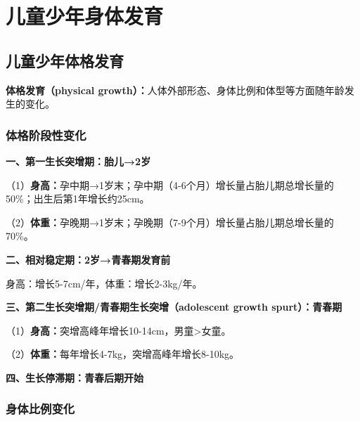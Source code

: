 \chapter{儿童少年身体发育}
\setcounter{chapter}{4}

\section{儿童少年体格发育}

\begin{defbox}
\textbf{体格发育（physical growth）：}人体外部形态、身体比例和体型等方面随年龄发生的变化。
\end{defbox}

\subsection{体格阶段性变化}

\begin{keybox}
\textbf{一、第一生长突增期：胎儿→2岁}

（1）\textbf{身高：}孕中期→1岁末；孕中期（4-6个月）增长量占胎儿期总增长量的50\%；出生后第1年增长约25cm。

（2）\textbf{体重：}孕晚期→1岁末；孕晚期（7-9个月）增长量占胎儿期总增长量的70\%。

\textbf{二、相对稳定期：2岁→青春期发育前}

身高：增长5-7cm/年，体重：增长2-3kg/年。

\textbf{三、第二生长突增期/青春期生长突增（adolescent growth spurt）：青春期}

（1）\textbf{身高：}突增高峰年增长10-14cm，男童>女童。

（2）\textbf{体重：}每年增长4-7kg，突增高峰年增长8-10kg。

\textbf{四、生长停滞期：青春后期开始}
\end{keybox}

\subsection{身体比例变化}

